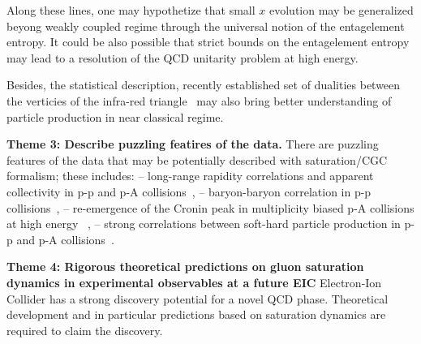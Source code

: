 Along these lines, one may hypothetize that small $x$ evolution may be generalized beyong 
weakly coupled regime through the universal notion of the entagelement entropy. 
It could be also possible  that strict bounds on the entagelement entropy~\cite{Holzhey:1994we,Calabrese:2005zw}
may lead 
to a resolution of the QCD unitarity problem at high energy. 

Besides, the statistical description, recently established set of dualities between the verticies 
of the infra-red triangle~\cite{Strominger:2017zoo,Pate:2017vwa,Ball:2018prg} may also bring better understanding of particle production in near classical regime. 

\vspace{0.5em}



\noindent

{\bf Theme 3:  Describe puzzling featires of the data. }
There are puzzling features of the data that may be potentially described 
with saturation/CGC formalism; these includes: 
-- long-range rapidity correlations and apparent collectivity in p-p and p-A 
collisions~\cite{Khachatryan:2010nk,Aad:2010ac,Aaij:2014pza,ALICE:2017pcy},  
-- baryon-baryon correlation in p-p collisions~\cite{Adam:2016iwf}, 
-- re-emergence of the Cronin peak in multiplicity biased p-A collisions at high energy~\cite{ALICE:2012mj} , 
-- strong correlations between soft-hard particle production in p-p and p-A collisions~\cite{ATLAS:2014cpa,Aad:2015ziq}. 


\vspace{0.5em}

\noindent

{\bf Theme 4:  Rigorous theoretical predictions 
on gluon saturation dynamics in experimental observables at a future EIC }
Electron-Ion Collider has a strong discovery potential 
for a novel QCD phase. Theoretical development and in particular 
predictions based on saturation dynamics are required to claim  the discovery. 

\vspace{2em}

